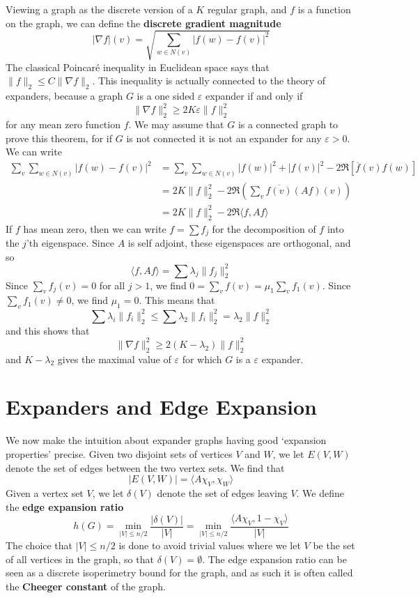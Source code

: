 Viewing a graph as the discrete version of a $K$ regular graph, and $f$ is a function on the graph, we can define the {\bf discrete gradient magnitude}
%
\[ |\nabla f|(v) = \sqrt{\sum_{w \in N(v)} |f(w) - f(v)|^2} \]
%
The classical Poincar\'{e} inequality in Euclidean space says that $\| f \|_2 \leq C \| \nabla f \|_2$. This inequality is actually connected to the theory of expanders, because a graph $G$ is a one sided $\varepsilon$ expander if and only if
%
\[ \| \nabla f \|_2^2 \geq 2K \varepsilon \| f \|_2^2 \]
%
for any mean zero function $f$. We may assume that $G$ is a connected graph to prove this theorem, for if $G$ is not connected it is not an expander for any $\varepsilon > 0$. We can write
%
\begin{align*}
    \sum_v \sum_{w \in N(v)} |f(w) - f(v)|^2 &= \sum_v \sum_{w \in N(v)} |f(w)|^2 + |f(v)|^2 - 2 \Re[\overline{f}(v) f(w)]\\
    &= 2K \| f \|_2^2 - 2 \Re \left( \sum_v \overline{f(v)} (Af)(v) \right)\\
    &= 2K \| f \|_2^2 - 2 \Re \langle f, Af \rangle
\end{align*}
%
If $f$ has mean zero, then we can write $f = \sum f_j$ for the decomposition of $f$ into the $j$'th eigenspace. Since $A$ is self adjoint, these eigenspaces are orthogonal, and so
%
\[ \langle f, Af \rangle = \sum \lambda_j \| f_j \|_2^2 \]
%
Since $\sum_v f_j(v) = 0$ for all $j > 1$, we find $0 = \sum_v f(v) = \mu_1 \sum_v f_1(v)$. Since $\sum_v f_1(v) \neq 0$, we find $\mu_1 = 0$. This means that
%
\[ \sum \lambda_i \| f_i \|_2^2 \leq \sum \lambda_2 \| f_i \|_2^2 = \lambda_2 \| f \|_2^2 \]
%
and this shows that
%
\[ \| \nabla f \|_2^2 \geq 2(K - \lambda_2) \| f \|_2^2 \]
%
and $K - \lambda_2$ gives the maximal value of $\varepsilon$ for which $G$ is a $\varepsilon$ expander.

\section{Expanders and Edge Expansion}

We now make the intuition about expander graphs having good `expansion properties' precise. Given two disjoint sets of vertices $V$ and $W$, we let $E(V,W)$ denote the set of edges between the two vertex sets. We find that
%
\[ |E(V,W)| = \langle A \chi_V, \chi_W \rangle \]
%
Given a vertex set $V$, we let $\delta(V)$ denote the set of edges leaving $V$. We define the {\bf edge expansion ratio}
%
\[ h(G) = \min_{|V| \leq n/2} \frac{|\delta(V)|}{|V|} = \min_{|V| \leq n/2} \frac{\langle A\chi_V, 1 - \chi_V \rangle}{|V|} \]
%
The choice that $|V| \leq n/2$ is done to avoid trivial values where we let $V$ be the set of all vertices in the graph, so that $\delta(V) = \emptyset$. The edge expansion ratio can be seen as a discrete isoperimetry bound for the graph, and as such it is often called the {\bf Cheeger constant} of the graph.


